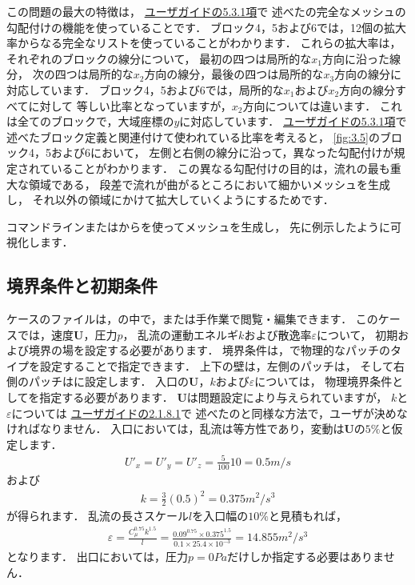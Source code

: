 この問題の最大の特徴は，
\href{UserGuideJa.pdf#subsection.5.3.1}{ユーザガイドの5.3.1項}で
述べたの完全なメッシュの勾配付けの機能を使っていることです．
ブロック4，5および6では，12個の拡大率からなる完全なリストを使っていることがわかります．
これらの拡大率は，それぞれのブロックの線分について，
最初の四つは局所的な$x_{1}$方向に沿った線分，
次の四つは局所的な$x_{2}$方向の線分，最後の四つは局所的な$x_{3}$方向の線分に対応しています．
ブロック4，5および6では，局所的な$x_{1}$および$x_{2}$方向の線分すべてに対して
等しい比率となっていますが，$x_{2}$方向については違います．
これは全てのブロックで，大域座標の$y$に対応しています．
\href{UserGuideJa.pdf#subsection.5.3.1}{ユーザガイドの5.3.1項}で
述べたブロック定義と関連付けて使われている比率を考えると，
\autoref{fig:3.5}のブロック4，5および6において，
左側と右側の線分に沿って，異なった勾配付けが規定されていることがわかります．
この異なる勾配付けの目的は，流れの最も重大な領域である，
段差で流れが曲がるところにおいて細かいメッシュを生成し，
それ以外の領域にかけて拡大していくようにするためです．

コマンドラインまたはからを使ってメッシュを生成し，
先に例示したように可視化します．


\subsection{境界条件と初期条件}
\label{ssec:3.2.3}
ケースのファイルは，の中で，または手作業で閲覧・編集できます．
このケースでは，速度$\bm{U}$，圧力$p$，
乱流の運動エネルギ$k$および散逸率$\varepsilon$について，
初期および境界の場を設定する必要があります．
境界条件は，で物理的なパッチのタイプを設定することで指定できます．
上下の壁は，左側のパッチは，
そして右側のパッチはに設定します．
入口の$\bm{U}$，$k$および$\varepsilon$については，
物理境界条件としてを指定する必要があります．
$\bm{U}$は問題設定により与えられていますが，
$k$と$\varepsilon$については
\href{UserGuideJa.pdf#subsubsection.2.1.8.1}{ユーザガイドの2.1.8.1}で
述べたのと同様な方法で，ユーザが決めなければなりません．
入口においては，乱流は等方性であり，変動は$\bm{U}$の$5\unit{\%}$と仮定します．
\begin{align}
 \label{eq:3.5}
 U'_{x} = U'_{y} = U'_{z} = \frac{5}{100}10 = 0.5 \unit{m/s}
\end{align}
および
\begin{align}
 \label{eq:3.6}
 k = \frac{3}{2}(0.5)^{2} = 0.375 \unit{m^{2}/s^{3}}
\end{align}
が得られます．
乱流の長さスケール$l$を入口幅の$10\unit{\%}$と見積もれば，
\begin{align}
 \label{eq:3.7}
 \varepsilon = \frac{C_{\mu}^{0.75}k^{1.5}}{l}
 = \frac{0.09^{0.75} \times 0.375^{1.5}}{0.1 \times 25.4 \times 10^{-3}}
 = 14.855 \unit{m^{2}/s^{3}}
\end{align}
となります．
出口においては，圧力$p = 0 \unit{Pa}$だけしか指定する必要はありません．


